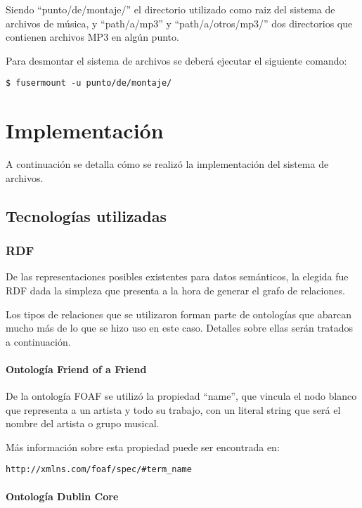 \documentclass[a4paper,oneside]{report}
\begin{document}
Siendo ``punto/de/montaje/'' el directorio utilizado como raiz del sistema de archivos de música, y ``path/a/mp3'' y ``path/a/otros/mp3/'' dos directorios que contienen archivos MP3 en algún punto.

Para desmontar el sistema de archivos se deberá ejecutar el siguiente comando:

\begin{lstlisting}
$ fusermount -u punto/de/montaje/
\end{lstlisting}

\chapter{Implementación}

A continuación se detalla cómo se realizó la implementación del sistema de archivos.

\section{Tecnologías utilizadas}

\subsection{RDF}

De las representaciones posibles existentes para datos semánticos, la elegida fue RDF dada la simpleza que presenta a la hora de generar el grafo de relaciones.

Los tipos de relaciones que se utilizaron forman parte de ontologías que abarcan mucho más de lo que se hizo uso en este caso. Detalles sobre ellas serán tratados a continuación.

\subsubsection{Ontología Friend of a Friend}

De la ontología FOAF se utilizó la propiedad ``name'', que vincula el nodo blanco que representa a un artista y todo su trabajo, con un literal string que será el nombre del artista o grupo musical.

Más información sobre esta propiedad puede ser encontrada en:

\begin{lstlisting}
http://xmlns.com/foaf/spec/#term_name
\end{lstlisting}

\subsubsection{Ontología Dublin Core}
\end{document}
